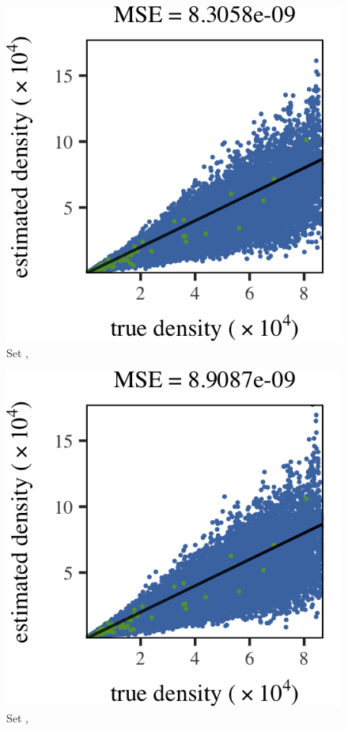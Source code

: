 
\begin{subfigure}{0.3\textwidth}
	\centering
	\includegraphics[keepaspectratio=true, width=\textwidth, height=0.23\textheight]{result/img/results_ferdosi_1_60000_mbe_silverman}
	\caption{Set \ferdosiOne, \mbe}
	\label{fig:results:singlesphere:mbe:ferdosi1}
\end{subfigure}
\begin{subfigure}{0.3\textwidth}
	\centering
	\includegraphics[keepaspectratio=true, width=\textwidth, height=0.23\textheight]{result/img/results_ferdosi_1_60000_sambe_silverman}
	\caption{Set \ferdosiOne, \sambe}
	\label{fig:results:singlesphere:sambe:ferdosi1}
\end{subfigure}

